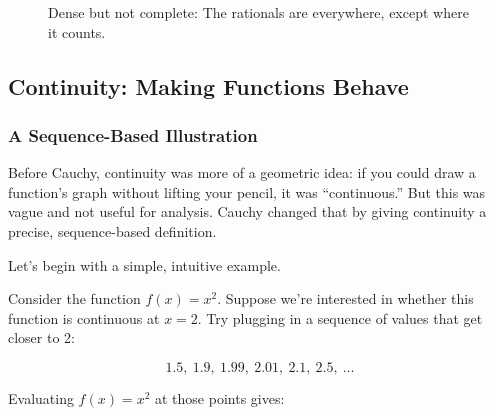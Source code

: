 \begin{figure}[H]
\centering
{}
\caption{Dense but not complete: The rationals are everywhere, except where it counts.}
\end{figure}




\subsection{Continuity: Making Functions Behave}

\subsubsection{A Sequence-Based Illustration}


Before Cauchy, continuity was more of a geometric idea: if you could draw a function’s graph without lifting your pencil, it was “continuous.” But this was vague and not useful for analysis. Cauchy changed that by giving continuity a precise, sequence-based definition.

Let’s begin with a simple, intuitive example.


Consider the function \( f(x) = x^2 \). Suppose we’re interested in whether this function is continuous at \( x = 2 \). Try plugging in a sequence of values that get closer to 2:

\[
1.5,\ 1.9,\ 1.99,\ 2.01,\ 2.1,\ 2.5,\ \dots
\]

Evaluating \( f(x) = x^2 \) at those points gives:

